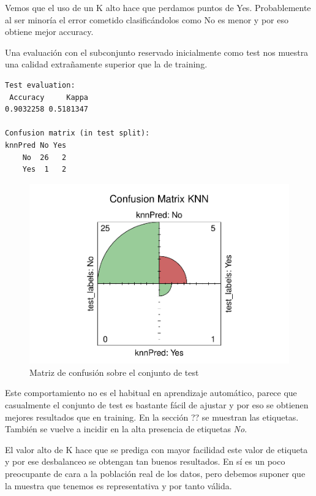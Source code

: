 Vemos que el uso de un K alto hace que perdamos puntos de Yes. Probablemente al ser minoría el error cometido clasificándolos como No es menor y por eso obtiene mejor accuracy.

\vspace{\baselineskip}

Una evaluación con el subconjunto reservado inicialmente como test nos muestra una calidad extrañamente superior que la de training.

\begin{verbatim}
Test evaluation:
 Accuracy     Kappa 
0.9032258 0.5181347 

Confusion matrix (in test split):
knnPred No Yes
    No  26   2
    Yes  1   2
\end{verbatim}

\begin{figure}[H]\center\includegraphics[width=.9\linewidth]{img/Clasificacion_files/figure-latex/unnamed-chunk-9-1}\caption{Matriz de confusión sobre el conjunto de test}\end{figure}

Este comportamiento no es el habitual en aprendizaje automático, parece que casualmente el conjunto de test es bastante fácil de ajustar y por eso se obtienen mejores resultados que en training.
En la sección ?? se muestran las etiquetas. También se vuelve a incidir en la alta presencia de etiquetas \textit{No}.

El valor alto de K hace que se prediga con mayor facilidad este valor de etiqueta y por ese desbalanceo se obtengan tan buenos resultados. En sí es un poco preocupante de cara a la población real de los datos, pero debemos suponer que la muestra que tenemos es representativa y por tanto válida.

